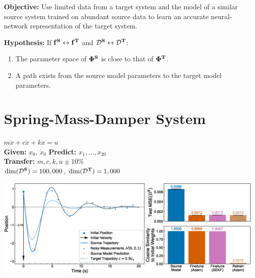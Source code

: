 \documentclass[a0paper,fleqn]{betterposter}
\newcommand{\source}{\mathrm{\bf{S}}}
\newcommand{\target}{\mathrm{\bf{T}}}
\newcommand{\D}{\mathcal{D}}
\newcommand{\nn}{\bm \Phi}
\newcommand{\sourceD}{\D^\source}
\newcommand{\targetD}{\D^\target}
\newcommand{\sourceNN}{\nn^\source}
\newcommand{\targetNN}{\nn^\target}
\newcommand{\f}{\mathrm{\bf{f}}}
\newcommand{\fSource}{\f^\source}
\newcommand{\fTarget}{\f^\target}
\begin{document}
{%
\textbf{Objective:} Use limited data from a target system and the model of a similar source system trained on abundant source data to learn an accurate neural-network representation of the target system.

\textbf{Hypothesis:} If $\f^\source\leftrightarrow\f^\target$ and $\sourceD\leftrightarrow\targetD$:
\begin{enumerate}
    \item The parameter space of $\sourceNN$ is close to that of $\targetNN$.
    \item A path exists from the source model parameters to the target model parameters.
\end{enumerate} 

\section{Spring-Mass-Damper System}
$m\ddot{x} + c\dot{x} + kx = u$\\
\textbf{Given:} $x_0$, $\dot{x}_0$ \hspace{3em} \textbf{Predict:} $x_1, \ldots , x_{20}$\\
\textbf{Transfer:} $m,c,k,u\pm10\%$\\
$\dim(\sourceD)=100,000$, $\dim(\targetD)=1,000$

\begin{center}
\includegraphics[width=\textwidth]{img/springResults}
\end{center}

}
\end{document}
